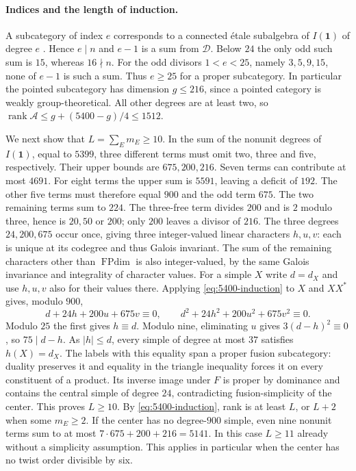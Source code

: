 \documentclass[11pt,a4paper]{article}
\numberwithin{equation}{section}
\theoremstyle{remark}
\newcommand{\one}{\mathbf1}
\newcommand{\FPdim}{\operatorname{FPdim}}
\newcommand{\rank}{\operatorname{rank}}
\begin{document}
\paragraph{Indices and the length of induction.}
A subcategory of index $e$ corresponds to a connected \'etale
subalgebra of $I(\one)$ of degree $e$
\cite[Theorem~4.10]{DMNOWitt}. Hence $e\mid n$ and $e-1$ is a sum
from $\mathcal D$. Below $24$ the only odd such sum is $15$, whereas
$16\nmid n$. For the odd divisors $1<e<25$, namely $3,5,9,15$, none
of $e-1$ is such a sum. Thus $e\ge25$ for a proper subcategory.
In particular the pointed subcategory has dimension $g\le216$, since a
pointed category is weakly group-theoretical. All other degrees are
at least two, so $\rank\mathcal A\le g+(5400-g)/4\le1512$.

We next show that $L=\sum_E m_E\ge10$. In the sum of the nonunit
degrees of $I(\one)$, equal to $5399$, three different terms must omit
two, three and five, respectively. Their upper bounds are $675,200,216$.
Seven terms can contribute at most $4691$. For eight terms the upper
sum is $5591$, leaving a deficit of $192$. The other five terms must
therefore equal $900$ and the odd term $675$. The two remaining terms
sum to $224$. The three-free term divides $200$ and is $2$ modulo three,
hence is $20,50$ or $200$; only $200$ leaves a divisor of $216$.
The three degrees $24,200,675$ occur once, giving three integer-valued
linear characters $h,u,v$: each is unique at its codegree and thus Galois
invariant. The sum of the remaining characters other than $\FPdim$
is also integer-valued, by the same Galois invariance and integrality
of character values. For a simple $X$ write $d=d_X$ and use $h,u,v$
also for their values there. Applying \eqref{eq:5400-induction} to
$X$ and $XX^*$ gives, modulo $900$,
\[
 d+24h+200u+675v\equiv0,\qquad
 d^2+24h^2+200u^2+675v^2\equiv0 .
\]
Modulo $25$ the first gives $h\equiv d$. Modulo nine, eliminating
$u$ gives $3(d-h)^2\equiv0$, so $75\mid d-h$. As $|h|\le d$,
every simple of degree at most $37$ satisfies $h(X)=d_X$. The labels
with this equality span a proper fusion subcategory: duality preserves
it and equality in the triangle inequality forces it on every
constituent of a product. Its inverse image under $F$ is proper by
dominance and contains the central simple of degree $24$,
contradicting fusion-simplicity of the center. This proves $L\ge10$.
By \eqref{eq:5400-induction}, rank is at least $L$, or $L+2$ when
some $m_E\ge2$. If the center has no degree-$900$ simple, even nine
nonunit terms sum to at most $7\cdot675+200+216=5141$. In this case
$L\ge11$ already without a simplicity assumption. This applies in
particular when the center has no twist order divisible by six.
\end{document}
